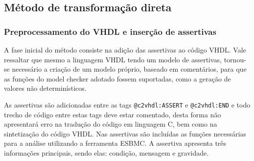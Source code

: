 \subsection{Método de transformação direta}

\subsubsection{Preprocessamento do VHDL e inserção de assertivas}

\par
A fase inicial do método consiste na adição das assertivas ao código VHDL. Vale ressaltar que mesmo a linguagem VHDL tendo um modelo de assertivas, tornou-se necessário a criação de um modelo próprio, baseado em comentários, para que as funções do model checker adotado fossem suportadas, como a geração de valores não determinísticos. 

\par
As assertivas são adicionadas entre as tags \texttt{@c2vhdl:ASSERT} e \texttt{@c2vhdl:END} e todo trecho de código entre estas tags deve estar comentado, desta forma não apresentará erro na tradução do código em linguagem C, bem como na sintetização do código VHDL. Nas assertivas são incluídas as funções necessárias para a análise utilizando a ferramenta ESBMC. A assertiva apresenta três informações principais, sendo elas: condição, mensagem e gravidade. 

